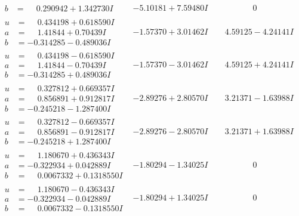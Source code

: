 \documentclass[1p]{elsarticle_modified}
\theoremstyle{definition}
\begin{document}
$$\begin{array}{c|c|c}
\begin{aligned}
b &= \phantom{-}0.290942 + 1.342730 I\end{aligned}
 & -5.10181 + 7.59480 I & \phantom{-0.000000 } 0 \\ \hline\begin{aligned}
u &= \phantom{-}0.434198 + 0.618590 I \\
a &= \phantom{-}1.41844 + 0.70439 I \\
b &= -0.314285 - 0.489036 I\end{aligned}
 & -1.57370 + 3.01462 I & \phantom{-}4.59125 - 4.24141 I \\ \hline\begin{aligned}
u &= \phantom{-}0.434198 - 0.618590 I \\
a &= \phantom{-}1.41844 - 0.70439 I \\
b &= -0.314285 + 0.489036 I\end{aligned}
 & -1.57370 - 3.01462 I & \phantom{-}4.59125 + 4.24141 I \\ \hline\begin{aligned}
u &= \phantom{-}0.327812 + 0.669357 I \\
a &= \phantom{-}0.856891 + 0.912817 I \\
b &= -0.245218 - 1.287400 I\end{aligned}
 & -2.89276 + 2.80570 I & \phantom{-}3.21371 - 1.63988 I \\ \hline\begin{aligned}
u &= \phantom{-}0.327812 - 0.669357 I \\
a &= \phantom{-}0.856891 - 0.912817 I \\
b &= -0.245218 + 1.287400 I\end{aligned}
 & -2.89276 - 2.80570 I & \phantom{-}3.21371 + 1.63988 I \\ \hline\begin{aligned}
u &= \phantom{-}1.180670 + 0.436343 I \\
a &= -0.322934 + 0.042889 I \\
b &= \phantom{-}0.0067332 + 0.1318550 I\end{aligned}
 & -1.80294 - 1.34025 I & \phantom{-0.000000 } 0 \\ \hline\begin{aligned}
u &= \phantom{-}1.180670 - 0.436343 I \\
a &= -0.322934 - 0.042889 I \\
b &= \phantom{-}0.0067332 - 0.1318550 I\end{aligned}
 & -1.80294 + 1.34025 I & \phantom{-0.000000 } 0 \\ \hline\begin{aligned}

\end{aligned}
\end{array}$$
\end{document}
